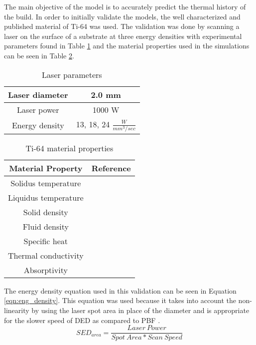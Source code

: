 The main objective of the model is to accurately predict the thermal history of the build.  
In order to initially validate the models, the well characterized and published material of Ti-64 was used.  The validation was done by scanning a laser on the surface of a substrate at three energy densities with experimental parameters found in Table \ref{tab:ti64_parameters} and the material properties used in the simulations can be seen in Table \ref{tab:ti64_properties}.
\begin{table}[!htb] \centering
	\caption{Laser parameters}
	\label{tab:ti64_parameters}
		\begin{tabular}{|c|c|} \hline 
			Laser diameter & 2.0 mm \\ \hline
			Laser power & 1000 W \\ \hline
			Energy density & 13, 18, 24 $\frac{W}{mm^3/sec}$ \\ \hline
		\end{tabular}
\end{table}
\begin{table}[!htb] \centering
	\caption{Ti-64  material properties}
	\label{tab:ti64_properties}
	\begin{tabular}{|c|c|} \hline
		Material Property & Reference \\ \hline
		Solidus temperature & \cite{welschgerhard_1993} \\ \hline
		Liquidus temperature & \cite{mills_2002} \\ \hline
		Solid density  & \cite{mills_2002} \\ \hline
		Fluid density & \cite{mills_2002} \\ \hline
		Specific heat & \cite{boivineau_2006} \\ \hline
		Thermal conductivity & \cite{boivineau_2006} \\ \hline
		Absorptivity & \cite{fan_2012} \\ \hline
	\end{tabular}
\end{table}
The energy density equation used in this validation can be seen in Equation \ref{eqn:eng_density}.  This equation was used because it takes into account the non-linearity by using the laser spot area in place of the diameter and is appropriate for the slower speed of \ac{DED} as compared to \ac{PBF} \cite{kurzynowskiEffectScanningSupport2019}.
\begin{equation}
	SED_{area} = \frac{Laser\ Power}{Spot\ Area * Scan\ Speed} \label{eqn:eng_density}
\end{equation}

